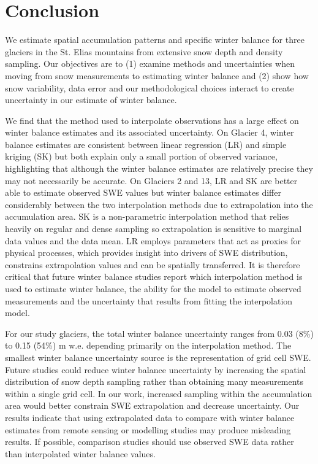 \documentclass[review,oneside, letterpaper]{igs}
\begin{document}
\section{Conclusion}

We estimate spatial accumulation patterns and specific winter balance for three glaciers in the St. Elias mountains from extensive snow depth and density sampling. Our objectives are to (1) examine methods and uncertainties when moving from snow measurements to estimating winter balance and (2) show how snow variability, data error and our methodological choices interact to create uncertainty in our estimate of winter balance.

We find that the method used to interpolate observations has a large effect on winter balance estimates and its associated uncertainty. On Glacier 4, winter balance estimates are consistent between linear regression (LR) and simple kriging (SK) but both explain only a small portion of observed variance, highlighting that although the winter balance estimates are relatively precise they may not necessarily be accurate. On Glaciers 2 and 13, LR and SK are better able to estimate observed SWE values but winter balance estimates differ considerably between the two interpolation methods due to extrapolation into the accumulation area. SK is a non-parametric interpolation method that relies heavily on regular and dense sampling so extrapolation is sensitive to marginal data values and the data mean. LR employs parameters that act as proxies for physical processes, which provides insight into drivers of SWE distribution, constrains extrapolation values and can be spatially transferred. It is therefore critical that future winter balance studies report which interpolation method is used to estimate winter balance, the ability for the model to estimate observed measurements and the uncertainty that results from fitting the interpolation model. 

For our study glaciers, the total winter balance uncertainty ranges from 0.03 (8\%) to 0.15 (54\%) m w.e. depending primarily on the interpolation method. The smallest winter balance uncertainty source is the representation of grid cell SWE. Future studies could reduce winter balance uncertainty by increasing the spatial distribution of snow depth sampling rather than obtaining many measurements within a single grid cell. In our work, increased sampling within the accumulation area would better constrain SWE extrapolation and decrease uncertainty. Our results indicate that using extrapolated data to compare with winter balance estimates from remote sensing or modelling studies may produce misleading results. If possible, comparison studies should use observed SWE data rather than interpolated winter balance values. 
\end{document}
